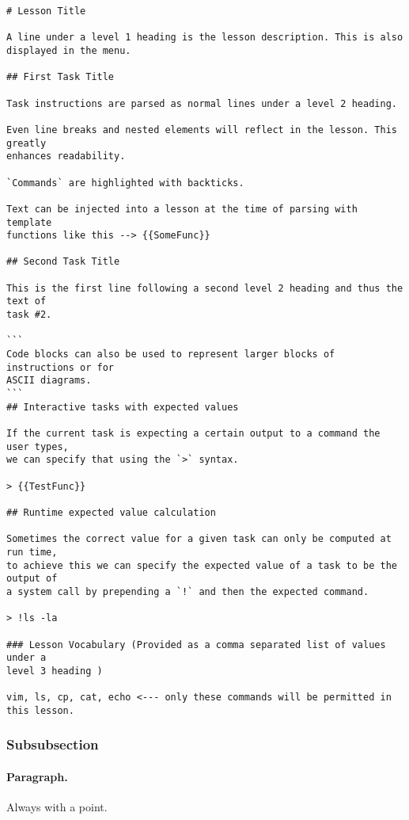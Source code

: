\begin{lstlisting}[float=htbp, frame=single, language={}, caption=Specification for Markdown lesson files.]
# Lesson Title

A line under a level 1 heading is the lesson description. This is also
displayed in the menu.

## First Task Title

Task instructions are parsed as normal lines under a level 2 heading.

Even line breaks and nested elements will reflect in the lesson. This greatly
enhances readability.

`Commands` are highlighted with backticks.

Text can be injected into a lesson at the time of parsing with template
functions like this --> {{SomeFunc}}

## Second Task Title

This is the first line following a second level 2 heading and thus the text of
task #2.

```
Code blocks can also be used to represent larger blocks of instructions or for
ASCII diagrams.
```
## Interactive tasks with expected values

If the current task is expecting a certain output to a command the user types,
we can specify that using the `>` syntax.

> {{TestFunc}}

## Runtime expected value calculation

Sometimes the correct value for a given task can only be computed at run time,
to achieve this we can specify the expected value of a task to be the output of
a system call by prepending a `!` and then the expected command.

> !ls -la

### Lesson Vocabulary (Provided as a comma separated list of values under a
level 3 heading )

vim, ls, cp, cat, echo <--- only these commands will be permitted in this lesson.

\end{lstlisting}


\subsubsection{Subsubsection}

\paragraph{Paragraph.} Always with a point.


